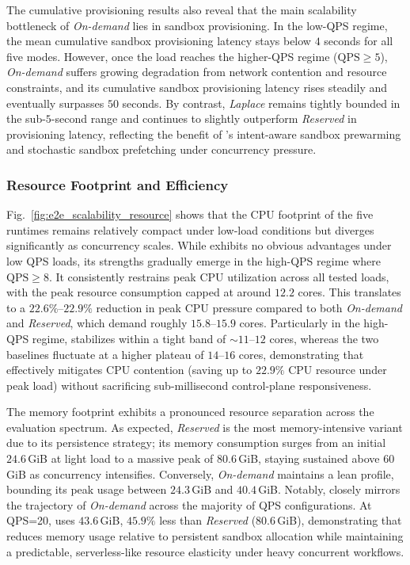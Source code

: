 The cumulative provisioning results also reveal that the main scalability bottleneck of \textit{On-demand} lies in sandbox provisioning. In the low-QPS regime, the mean cumulative sandbox provisioning latency stays below $4$ seconds for all five modes. However, once the load reaches the higher-QPS regime ($\text{QPS}\geq 5$), \textit{On-demand} suffers growing degradation from network contention and resource constraints, and its cumulative sandbox provisioning latency rises steadily and eventually surpasses $50$ seconds. By contrast, \textit{Laplace} remains tightly bounded in the sub-$5$-second range and continues to slightly outperform \textit{Reserved} in provisioning latency, reflecting the benefit of \SystemName's intent-aware sandbox prewarming and stochastic sandbox prefetching under concurrency pressure.

\subsubsection{Resource Footprint and Efficiency}
\label{sec:exp:e2e_resource}

Fig.~\ref{fig:e2e_scalability_resource} shows that the CPU footprint of the five runtimes remains relatively compact under low-load conditions but diverges significantly as concurrency scales. While \textit{\SystemName} exhibits no obvious advantages under low QPS loads, its strengths gradually emerge in the high-QPS regime where \(\text{QPS}\geq 8\). It consistently restrains peak CPU utilization across all tested loads, with the peak resource consumption capped at around $12.2$ cores. This translates to a $22.6\%$--$22.9\%$ reduction in peak CPU pressure compared to both \textit{On-demand} and \textit{Reserved}, which demand roughly $15.8$--$15.9$ cores. Particularly in the high-QPS regime, \textit{\SystemName} stabilizes within a tight band of $\sim 11$--$12$ cores, whereas the two baselines fluctuate at a higher plateau of $14$--$16$ cores, demonstrating that \SystemName effectively mitigates CPU contention (saving up to $22.9\%$ CPU resource under peak load) without sacrificing sub-millisecond control-plane responsiveness.

The memory footprint exhibits a pronounced resource separation across the evaluation spectrum. As expected, \textit{Reserved} is the most memory-intensive variant due to its persistence strategy; its memory consumption surges from an initial $24.6$\,GiB at light load to a massive peak of $80.6$\,GiB, staying sustained above $60$\,GiB as concurrency intensifies. Conversely, \textit{On-demand} maintains a lean profile, bounding its peak usage between $24.3$\,GiB and $40.4$\,GiB. Notably, \textit{\SystemName} closely mirrors the trajectory of \textit{On-demand} across the majority of QPS configurations. At QPS=20, \textit{\SystemName} uses $43.6$\,GiB, $45.9\%$ less than \textit{Reserved} ($80.6$\,GiB), demonstrating that \SystemName reduces memory usage relative to persistent sandbox allocation while maintaining a predictable, serverless-like resource elasticity under heavy concurrent workflows.

